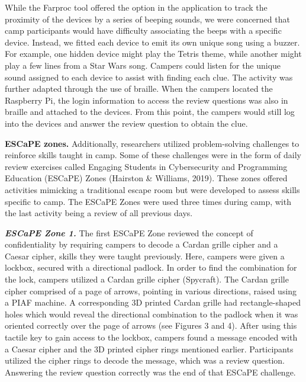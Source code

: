 \documentclass[11.5pt]{sig-alternate} %
\begin{document}
\begin{large}
While the Farproc tool offered the option in the application to track the proximity of the devices by a series of beeping sounds, we were concerned that camp participants would have difficulty associating the beeps with a specific device. Instead, we fitted each device to emit its own unique song using a buzzer. For example, one hidden device might play the Tetris theme, while another might play a few lines from a Star Wars song. Campers could listen for the unique sound assigned to each device to assist with finding each clue. The activity was further adapted through the use of braille. When the campers located the Raspberry Pi, the login information to access the review questions was also in braille and attached to the devices. From this point, the campers would still log into the devices and answer the review question to obtain the clue. 

\textbf{ESCaPE zones.} Additionally, researchers utilized problem-solving challenges to reinforce skills taught in camp. Some of these challenges were in the form of daily review exercises called Engaging Students in Cybersecurity and Programming Education (ESCaPE) Zones (Hairston \& Williams, 2019). These zones offered activities mimicking a traditional escape room but were developed to assess skills specific to camp. The ESCaPE Zones were used three times during camp, with the last activity being a review of all previous days. 

\textbf{\textit{ESCaPE Zone 1.}} The first ESCaPE Zone reviewed the concept of confidentiality by requiring campers to decode a Cardan grille cipher and a Caesar cipher, skills they were taught previously. Here, campers were given a lockbox, secured with a directional padlock. In order to find the combination for the lock, campers utilized a Cardan grille cipher (Spycraft). The Cardan grille cipher comprised of a page of arrows, pointing in various directions, raised using a PIAF machine. A corresponding 3D printed Cardan grille had rectangle-shaped holes which would reveal the directional combination to the padlock when it was oriented correctly over the page of arrows (see Figures 3 and 4). After using this tactile key to gain access to the lockbox, campers found a message encoded with a Caesar cipher and the 3D printed cipher rings mentioned earlier. Participants utilized the cipher rings to decode the message, which was a review question. Answering the review question correctly was the end of that ESCaPE challenge.


\end{large}
\end{document}
